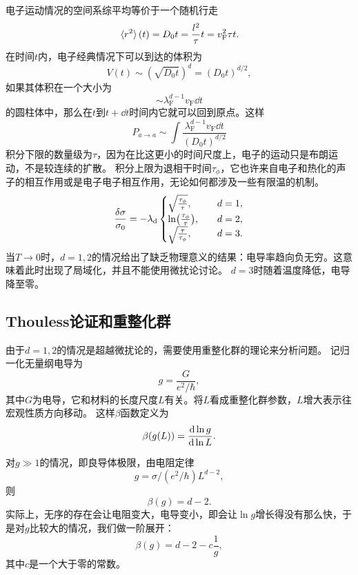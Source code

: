 电子运动情况的空间系综平均等价于一个随机行走
\[
    \expval*{r^2}(t) = D_0 t = \frac{l^2}{\tau} t = v_\text{F}^2 \tau t.
\]
在时间$t$内，电子经典情况下可以到达的体积为
\[
    V(t) \sim (\sqrt{D_0 t})^d = (D_0 t)^{d/2},
\]
如果其体积在一个大小为
\[
    \sim \lambda_\text{F}^{d-1} v_\text{F} \dd{t}
\]
的圆柱体中，那么在$t$到$t+\dd{t}$时间内它就可以回到原点。这样
\[
    P_{a \to a} \sim \int \frac{\lambda_\text{F}^{d-1} v_\text{F} \dd{t}}{(D_0 t)^{d/2}} 
\]
积分下限的数量级为$\tau$，因为在比这更小的时间尺度上，电子的运动只是布朗运动，不是较连续的扩散。
积分上限为退相干时间$\tau_\phi$，它也许来自电子和热化的声子的相互作用或是电子电子相互作用，无论如何都涉及一些有限温的机制。
\[
    \frac{\var{\sigma}}{\sigma_0} = - \lambda_\text{d} \begin{cases}
        \sqrt{\frac{\tau_\phi}{\tau}}, \quad &d = 1, \\
        \ln(\frac{\tau_\phi}{\tau}) , \quad &d = 2, \\
        \sqrt{\frac{\tau}{\tau_\phi}} , \quad &d = 3.
    \end{cases}
\]
当$T\to 0$时，$d=1, 2$的情况给出了缺乏物理意义的结果：电导率趋向负无穷。这意味着此时出现了局域化，并且不能使用微扰论讨论。
$d=3$时随着温度降低，电导降至零。

\subsection{Thouless论证和重整化群}

由于$d=1, 2$的情况是超越微扰论的，需要使用重整化群的理论来分析问题。
记归一化无量纲电导为
\begin{equation}
    g = \frac{G}{e^2 / \hbar},
\end{equation}
其中$G$为电导，它和材料的长度尺度$L$有关。将$L$看成重整化群参数，$L$增大表示往宏观性质方向移动。
这样$\beta$函数定义为
\begin{equation}
    \beta(g(L)) = \dv{\ln g}{\ln L}.    
\end{equation}

对$g \gg 1$的情况，即良导体极限，由电阻定律
\[
    g = \sigma / (e^2 / \hbar) L^{d-2},
\]
则
\[
    \beta(g) = d - 2.
\]
实际上，无序的存在会让电阻变大，电导变小，即会让$\ln g$增长得没有那么快，于是对$g$比较大的情况，我们做一阶展开：
\begin{equation}
    \beta(g) = d - 2 - c \frac{1}{g},
    \label{eq:disorder-rg-large-g}
\end{equation}
其中$c$是一个大于零的常数。

